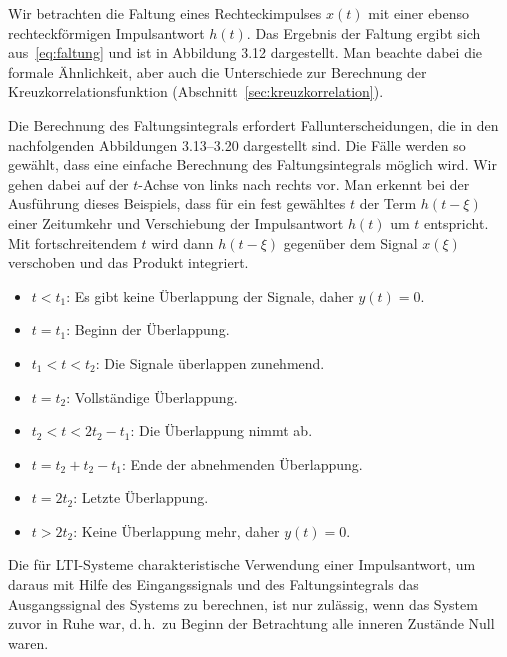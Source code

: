 \begin{beispiel}
Wir betrachten die Faltung eines Rechteckimpulses $x(t)$ mit einer ebenso rechteckförmigen Impulsantwort $h(t)$. Das Ergebnis der Faltung ergibt sich aus~\eqref{eq:faltung} und ist in Abbildung 3.12 dargestellt. Man beachte dabei die formale Ähnlichkeit, aber auch die Unterschiede zur Berechnung der Kreuzkorrelationsfunktion (Abschnitt~\ref{sec:kreuzkorrelation}).


Die Berechnung des Faltungsintegrals erfordert Fallunterscheidungen, die in den nachfolgenden Abbildungen 3.13–3.20 dargestellt sind. Die Fälle werden so gewählt, dass eine einfache Berechnung des Faltungsintegrals möglich wird. Wir gehen dabei auf der $t$-Achse von links nach rechts vor. Man erkennt bei der Ausführung dieses Beispiels, dass für ein fest gewähltes $t$ der Term $h(t - \xi)$ einer Zeitumkehr und Verschiebung der Impulsantwort $h(t)$ um $t$ entspricht. Mit fortschreitendem $t$ wird dann $h(t - \xi)$ gegenüber dem Signal $x(\xi)$ verschoben und das Produkt integriert.

\begin{itemize}
  \item $t < t_1$: Es gibt keine Überlappung der Signale, daher $y(t) = 0$.
  \item $t = t_1$: Beginn der Überlappung.
  \item $t_1 < t < t_2$: Die Signale überlappen zunehmend.
  \item $t = t_2$: Vollständige Überlappung.
  \item $t_2 < t < 2t_2 - t_1$: Die Überlappung nimmt ab.
  \item $t = t_2 + t_2 - t_1$: Ende der abnehmenden Überlappung.
  \item $t = 2t_2$: Letzte Überlappung.
  \item $t > 2t_2$: Keine Überlappung mehr, daher $y(t) = 0$.
\end{itemize}
\end{beispiel}

Die für LTI-Systeme charakteristische Verwendung einer Impulsantwort, um daraus mit Hilfe des Eingangssignals und des Faltungsintegrals das Ausgangssignal des Systems zu berechnen, ist nur zulässig, wenn das System zuvor in Ruhe war, d.\,h.\ zu Beginn der Betrachtung alle inneren Zustände Null waren.

